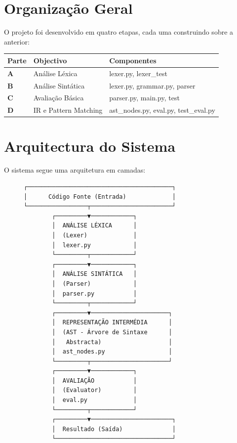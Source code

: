\documentclass[11pt,a4paper]{report}
\begin{document}
\section{Organização Geral}

O projeto foi desenvolvido em quatro etapas, cada uma construindo sobre a anterior:

\begin{center}
\begin{tabularx}{\textwidth}{|p{2cm}|X|p{6cm}|}
\hline
\textbf{Parte} & \textbf{Objectivo} & \textbf{Componentes} \\
\hline
\textbf{A} & Análise Léxica & lexer.py, lexer\_test \\
\hline
\textbf{B} & Análise Sintática & lexer.py, grammar.py, parser \\
\hline
\textbf{C} & Avaliação Básica & parser.py, main.py, test \\
\hline
\textbf{D} & IR e Pattern Matching & ast\_nodes.py, eval.py, test\_eval.py \\
\hline
\end{tabularx}
\end{center}

\section{Arquitectura do Sistema}

O sistema segue uma arquitetura em camadas:
\begin{figure}[H]
\centering
\begin{lstlisting}
┌─────────────────────────────────────────┐
│      Código Fonte (Entrada)             │
└─────────────────┬───────────────────────┘
        ┌─────────▼────────────┐
        │  ANÁLISE LÉXICA      │
        │  (Lexer)             │
        │  lexer.py            │
        └─────────┬────────────┘
        ┌─────────▼────────────┐
        │  ANÁLISE SINTÁTICA   │
        │  (Parser)            │
        │  parser.py           │
        └─────────┬────────────┘
        ┌─────────▼──────────────────────┐
        │  REPRESENTAÇÃO INTERMÉDIA      │
        │  (AST - Árvore de Sintaxe      │
        │   Abstracta)                   │
        │  ast_nodes.py                  │
        └─────────┬──────────────────────┘
        ┌─────────▼────────────┐
        │  AVALIAÇÃO           │
        │  (Evaluator)         │
        │  eval.py             │
        └─────────┬────────────┘
        ┌─────────▼───────────────────────┐
        │  Resultado (Saída)              │
        └─────────────────────────────────┘
\end{lstlisting}
\end{figure}
\end{document}
